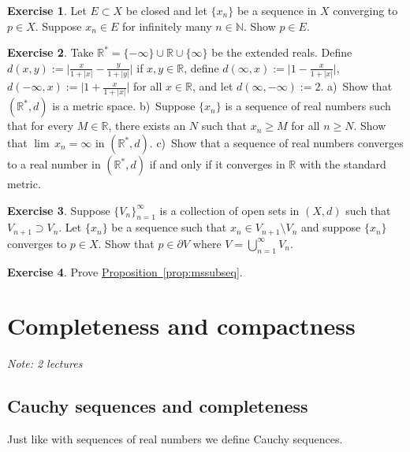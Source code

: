 \documentclass[12pt]{book}
\newcommand{\abs}[1]{\left\lvert {#1} \right\rvert}
\newcommand{\R}{{\mathbb{R}}}
\newcommand{\N}{{\mathbb{N}}}
\newcommand{\sectionnotes}[1]{\noindent \emph{Note: #1} \medskip \par}
\newcommand{\sectionnewpage}{\clearpage}
\theoremstyle{plain}
\theoremstyle{remark}
\theoremstyle{definition}
\theoremstyle{exercise}
\newtheorem{exercise}{Exercise}[section]
\theoremstyle{example}
\newcommand{\propref}[1]{\hyperref[#1]{Proposition~\ref*{#1}}}
\begin{document}
\begin{exercise}
Let $E \subset X$ be closed and
let $\{ x_n \}$ be a sequence in $X$ converging to $p \in X$.  Suppose
$x_n \in E$ for infinitely many $n \in \N$.  Show $p \in E$.
\end{exercise}

\begin{exercise}
Take $\R^* = \{ -\infty \} \cup \R \cup \{ \infty \}$ be the extended reals.
Define $d(x,y) := \bigl\lvert \frac{x}{1+\abs{x}} - \frac{y}{1+\abs{y}}
\bigr\rvert$
if $x, y \in \R$,
define $d(\infty,x) := \bigl\lvert 1 - \frac{x}{1+\abs{x}} \bigr\rvert$,
$d(-\infty,x) := \bigl\lvert 1 + \frac{x}{1+\abs{x}} \bigr\rvert$
for all $x \in \R$, and
let $d(\infty,-\infty) := 2$.
a)~Show that $(\R^*,d)$ is a metric space.
b)~Suppose $\{ x_n \}$ is a sequence of real numbers such that
for every $M \in \R$, there exists an $N$ such that
$x_n \geq M$ for all $n \geq N$.  Show that $\lim\, x_n = \infty$ in
$(\R^*,d)$.
c)~Show that a sequence of real numbers converges to a real number
in $(\R^*,d)$ if and
only if it converges in $\R$ with the standard metric.
\end{exercise}

\begin{exercise}
Suppose $\{ V_n \}_{n=1}^\infty$ is a collection of open sets
in $(X,d)$
such that $V_{n+1} \supset V_n$.  Let $\{ x_n \}$ be a sequence
such that $x_n \in V_{n+1} \setminus V_n$ and suppose 
$\{ x_n \}$ converges to $p \in X$.  Show that $p \in \partial V$
where $V = \bigcup_{n=1}^\infty V_n$.
\end{exercise}

\begin{exercise}
Prove \propref{prop:mssubseq}.
\end{exercise}


\sectionnewpage
\section{Completeness and compactness}
\label{sec:metcompact}

\sectionnotes{2 lectures}

\subsection{Cauchy sequences and completeness}

Just like with sequences of real numbers we define Cauchy sequences.
\end{document}
